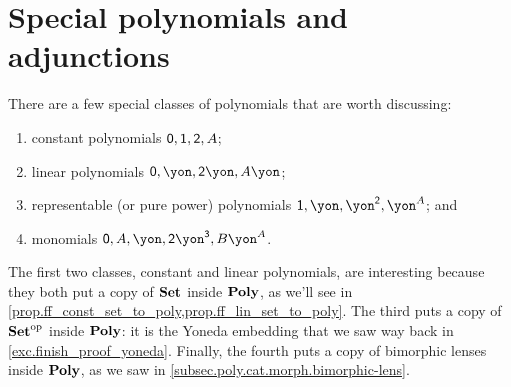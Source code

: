 \documentclass[Book-Poly]{subfiles}
\begin{document}
\section{Special polynomials and adjunctions} \label{sec.poly.bonus.adj}

There are a few special classes of polynomials that are worth discussing:
\begin{enumerate}[label=\alph*)]
	\item constant polynomials $\textsf{0},\textsf{1},\textsf{2},A$;
	\item linear polynomials $\0,\yon, \2\yon, A\yon$;
	\item representable (or pure power) polynomials $\1, \yon, \yon^\2, \yon^A$; and
	\item monomials $\0, A, \yon, \2\yon^\3, B\yon^A$.
\end{enumerate}
The first two classes, constant and linear polynomials, are interesting because they both put a copy of $\mathbf{Set}$ inside $\mathbf{Poly}$, as we'll see in \cref{prop.ff_const_set_to_poly,prop.ff_lin_set_to_poly}.
The third puts a copy of $\mathbf{Set}^{\textnormal{op}}$ inside $\mathbf{Poly}$: it is the Yoneda embedding that we saw way back in \cref{exc.finish_proof_yoneda}.
Finally, the fourth puts a copy of bimorphic lenses inside $\mathbf{Poly}$, as we saw in \cref{subsec.poly.cat.morph.bimorphic-lens}.
\end{document}
